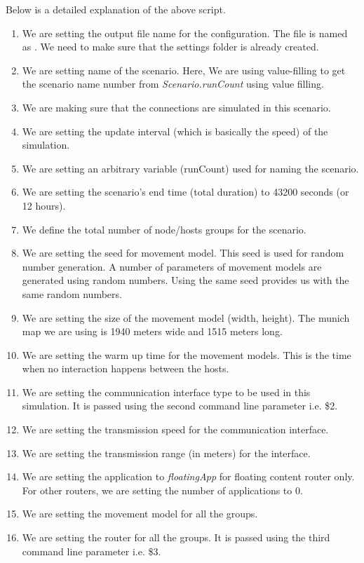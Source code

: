 Below is a detailed explanation of the above script.
\begin{enumerate}
  \item We are setting the output file name for the configuration. The file is named as . We need to make sure that the settings folder is already created.
  \item We are setting name of the scenario. Here, We are using value-filling to get the scenario name number from \textit{Scenario.runCount} using value filling.
  \item We are making sure that the connections are simulated in this scenario.
  \item We are setting the update interval (which is basically the speed) of the simulation.
  \item We are setting an arbitrary variable (runCount) used for naming the scenario.
  \item We are setting the scenario's end time (total duration) to 43200 seconds (or 12 hours).
  \item We define the total number of node/hosts groups for the scenario.
  \item We are setting the seed for movement model. This seed is used for random number generation. A number of parameters of movement models are generated using random numbers. Using the same seed provides us with the same random numbers.
  \item We are setting the size of the movement model (width, height). The munich map we are using is 1940 meters wide and 1515 meters long.
  \item We are setting the warm up time for the movement models. This is the time when no interaction happens between the hosts.
  \item We are setting the communication interface type to be used in this simulation. It is passed using the second command line parameter i.e. \${2}.
  \item We are setting the transmission speed for the communication interface.
  \item We are setting the transmission range (in meters) for the interface.
  \item We are setting the application to \textit{floatingApp} for floating content router only. For other routers, we are setting the number of applications to 0.
  \item We are setting the movement model for all the groups.
  \item We are setting the router for all the groups. It is passed using the third command line parameter i.e. \${3}.

\end{enumerate}
